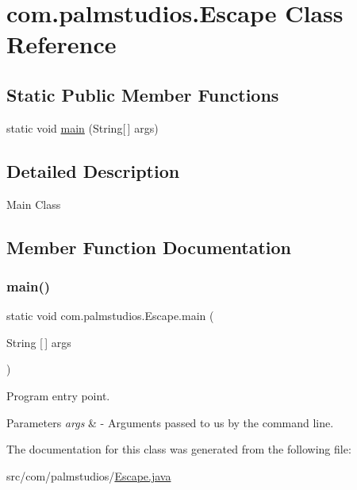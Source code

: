 \hypertarget{classcom_1_1palmstudios_1_1_escape}{}\section{com.\+palmstudios.\+Escape Class Reference}
\label{classcom_1_1palmstudios_1_1_escape}
\subsection*{Static Public Member Functions}
\begin{DoxyCompactItemize}
\item 
static void \hyperlink{classcom_1_1palmstudios_1_1_escape_adc9b40608ff77cc783661b1c6c574128}{main} (String\mbox{[}$\,$\mbox{]} args)
\end{DoxyCompactItemize}


\subsection{Detailed Description}
Main Class 

\subsection{Member Function Documentation}
\mbox{\label{classcom_1_1palmstudios_1_1_escape_adc9b40608ff77cc783661b1c6c574128}} 
\subsubsection{\texorpdfstring{main()}{main()}}
{\footnotesize\ttfamily static void com.\+palmstudios.\+Escape.\+main (\begin{DoxyParamCaption}\item[{String \mbox{[}$\,$\mbox{]}}]{args }\end{DoxyParamCaption})\hspace{0.3cm}{\ttfamily [static]}}

Program entry point.


\begin{DoxyParams}{Parameters}
{\em args} & -\/ Arguments passed to us by the command line. \\
\hline
\end{DoxyParams}


The documentation for this class was generated from the following file\+:\begin{DoxyCompactItemize}
\item 
src/com/palmstudios/\hyperlink{_escape_8java}{Escape.\+java}\end{DoxyCompactItemize}
